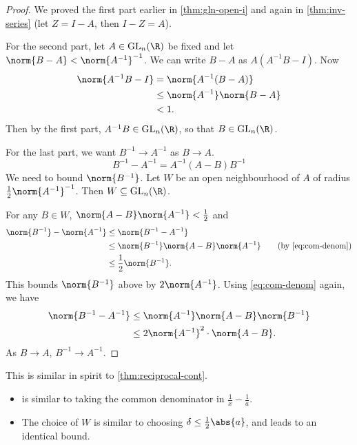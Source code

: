 \begin{proof}
    We proved the first part earlier in \cref{thm:gln-open-i} and again
    in \cref{thm:inv-series}
    (let $Z = I - A$, then $I - Z = A$).

    For the second part, let $A \in \GL_n(\R)$ be fixed and
    let $\norm{B - A} < {\norm{A^{-1}}}^{-1}$.
    We can write $B - A$ as $A(A^{-1}B - I)$.
    Now \begin{align*}
        \norm{A^{-1}B - I} &= \norm{A^{-1} (B - A)} \\
        &\leq \norm{A^{-1}} \norm{B - A} \\
        &< 1.
    \end{align*}
    Then by the first part, $A^{-1}B \in \GL_n(\R)$, so that
    $B \in \GL_n(\R)$.

    For the last part, we want $B^{-1} \to A^{-1}$ as $B \to A$.
    \begin{equation}
        B^{-1} - A^{-1} = A^{-1}(A - B)B^{-1} \label{eq:com-denom}
    \end{equation}
    We need to bound $\norm{B^{-1}}$.
    Let $W$ be an open neighbourhood of $A$ of radius
    $\frac12 \norm{A^{-1}}^{-1}$.
    Then $W \subseteq \GL_n(\R)$.

    For any $B \in W$, $\norm{A - B} \norm{A^{-1}} < \frac12$
    and \begin{align*}
        \norm{B^{-1}} - \norm{A^{-1}}
            &\le \norm{B^{-1} - A^{-1}} \\
            &\le \norm{B^{-1}} \norm{A - B} \norm{A^{-1}}
                \tag{by \cref{eq:com-denom}} \\
            &\le \frac12 \norm{B^{-1}}.
    \end{align*}
    This bounds $\norm{B^{-1}}$ above by $2\norm{A^{-1}}$.
    Using \cref{eq:com-denom} again, we have \begin{align*}
        \norm{B^{-1} - A^{-1}}
            &\le \norm{A^{-1}} \norm{A - B} \norm{B^{-1}} \\
            &\le 2 {\norm{A^{-1}}}^2 \cdot \norm{A - B}.
    \end{align*}
    As $B \to A$, $B^{-1} \to A^{-1}$.
\end{proof}
\begin{idea}
    This is similar in spirit to \cref{thm:reciprocal-cont}.
    \begin{itemize}
        \item {} is similar to taking the common
        denominator in $\frac1x - \frac1a$.
        \item The choice of $W$ is similar to choosing
        $\delta \le \frac12\abs{a}$, and leads to an identical bound.
    \end{itemize}
\end{idea}

